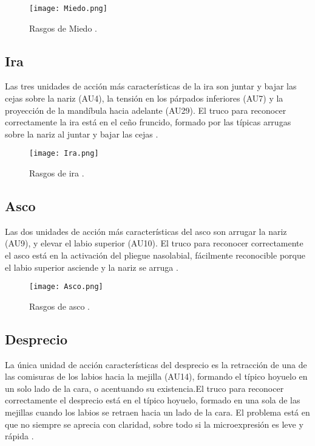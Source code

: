 \begin{figure}[h]
    \centering
    \texttt{[image: Miedo.png]}
    \caption{Rasgos de Miedo \cite{ReconocerLasEmociones}.}
    \label{fig:Miedo}
\end{figure}

\subsection*{Ira}
Las tres unidades de acción más características de la ira son juntar y bajar las cejas sobre la nariz (AU4), la tensión en los párpados inferiores (AU7) y la proyección de la mandíbula hacia adelante (AU29). El truco para reconocer correctamente la ira está en el ceño fruncido, formado por las típicas arrugas sobre la nariz al juntar y bajar las cejas \cite{ReconocerLasEmociones}.

\begin{figure}[h]
    \centering
    \texttt{[image: Ira.png]}
    \caption{Rasgos de ira \cite{ReconocerLasEmociones}.}
    \label{fig:Ira}
\end{figure}

\subsection*{Asco}
Las dos unidades de acción más características del asco son arrugar la nariz (AU9), y elevar el labio superior (AU10). El truco para reconocer correctamente el asco está en la activación del pliegue nasolabial, fácilmente reconocible porque el labio superior asciende y la nariz se arruga \cite{ReconocerLasEmociones}.

\begin{figure}[h]
    \centering
    \texttt{[image: Asco.png]}
    \caption{Rasgos de asco \cite{ReconocerLasEmociones}.}
    \label{fig:Asco}
\end{figure}

\subsection*{Desprecio}
La única unidad de acción características del desprecio es la retracción de una de las comisuras de los labios hacia la mejilla (AU14), formando el típico hoyuelo en un solo lado de la cara, o acentuando su existencia.El truco para reconocer correctamente el desprecio está en el típico hoyuelo, formado en una sola de las mejillas cuando los labios se retraen hacia un lado de la cara. El problema está en que no siempre se aprecia con claridad, sobre todo si la microexpresión es leve y rápida \cite{ReconocerLasEmociones}.


